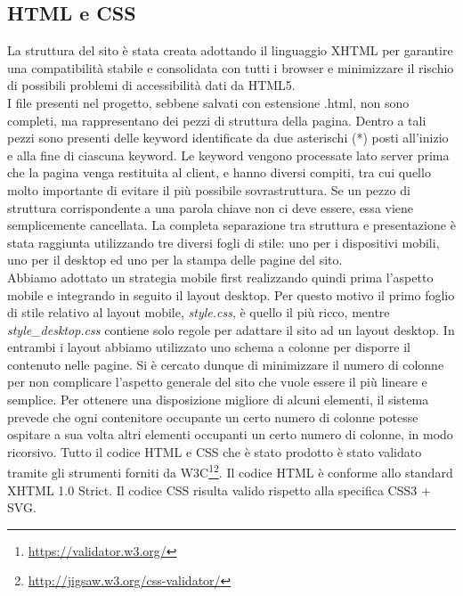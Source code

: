 \subsection{HTML e CSS}
La struttura del sito è stata creata adottando il linguaggio XHTML per garantire una compatibilità stabile e consolidata con tutti i browser e minimizzare il rischio di possibili problemi di accessibilità dati da HTML5.\\
I file presenti nel progetto, sebbene salvati con estensione .html, non sono completi, ma rappresentano dei pezzi di struttura della pagina. Dentro a tali pezzi sono presenti delle keyword identificate da due asterischi (*) posti all'inizio e alla fine di ciascuna keyword. Le keyword vengono processate lato server prima che la pagina venga restituita al client, e hanno diversi compiti, tra cui quello molto importante di evitare il più possibile sovrastruttura. Se un pezzo di struttura corrispondente a una parola chiave non ci deve essere, essa viene semplicemente cancellata.
La completa separazione tra struttura e presentazione è stata raggiunta utilizzando tre diversi fogli di stile: uno per i dispositivi mobili, uno per il desktop ed uno per la stampa delle pagine del sito.\\
 Abbiamo adottato un strategia mobile first realizzando quindi prima l'aspetto mobile e integrando in seguito il layout desktop. Per questo motivo il primo foglio di stile relativo al layout mobile, \textit{style.css}, è quello il più ricco, mentre \textit{style\_desktop.css} contiene solo regole per adattare il sito ad un layout desktop. In entrambi i layout abbiamo utilizzato uno schema a colonne per disporre il contenuto nelle pagine. Si è cercato dunque di minimizzare il numero di colonne per non complicare l'aspetto generale del sito che vuole essere il più lineare e semplice. Per ottenere una disposizione migliore di alcuni elementi, il sistema prevede che ogni contenitore occupante un certo numero di colonne potesse ospitare a sua volta altri elementi occupanti un certo numero di colonne, in modo ricorsivo.
Tutto il codice HTML e CSS che è stato prodotto è stato validato tramite gli strumenti forniti da W3C\footnote{\url{https://validator.w3.org/}}\footnote{\url{http://jigsaw.w3.org/css-validator/}}. Il codice HTML è conforme allo standard XHTML 1.0 Strict. Il codice CSS risulta valido rispetto alla specifica CSS3 + SVG.

